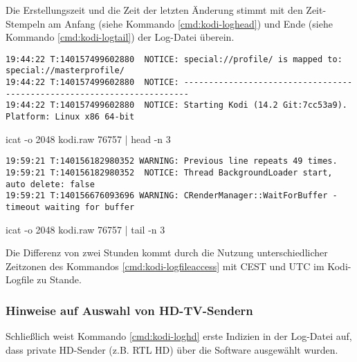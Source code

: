 Die Erstellungszeit und die Zeit der letzten Änderung stimmt mit den Zeit-Stempeln am Anfang (siehe Kommando \autoref{cmd:kodi-loghead}) und Ende (siehe Kommando \autoref{cmd:kodi-logtail}) der Log-Datei überein.

\begin{cmd}[H]
\begin{Verbatim}[fontsize=\tiny]
19:44:22 T:140157499602880  NOTICE: special://profile/ is mapped to: special://masterprofile/
19:44:22 T:140157499602880  NOTICE: -----------------------------------------------------------------------
19:44:22 T:140157499602880  NOTICE: Starting Kodi (14.2 Git:7cc53a9). Platform: Linux x86 64-bit
\end{Verbatim}
\caption{icat -o 2048 kodi.raw 76757 | head -n 3}
\label{cmd:kodi-loghead}
\end{cmd}

\begin{cmd}[H]
\begin{Verbatim}[fontsize=\tiny]
19:59:21 T:140156182980352 WARNING: Previous line repeats 49 times.
19:59:21 T:140156182980352  NOTICE: Thread BackgroundLoader start, auto delete: false
19:59:21 T:140156676093696 WARNING: CRenderManager::WaitForBuffer - timeout waiting for buffer
\end{Verbatim}
\caption{icat -o 2048 kodi.raw 76757 | tail -n 3}
\label{cmd:kodi-logtail}
\end{cmd}

Die Differenz von zwei Stunden kommt durch die Nutzung unterschiedlicher Zeitzonen des Kommandos \autoref{cmd:kodi-logfileaccess} mit CEST und UTC im Kodi-Logfile zu Stande.

\subsubsection{Hinweise auf Auswahl von HD-TV-Sendern}

Schließlich weist Kommando \autoref{cmd:kodi-loghd} erste Indizien in der Log-Datei auf, dass private HD-Sender (z.B. RTL HD) über die Software ausgewählt wurden.

